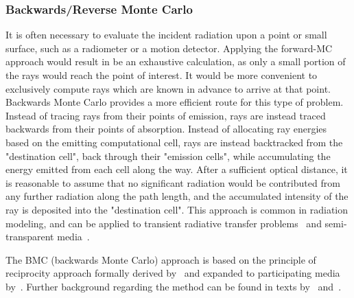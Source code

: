 \subsubsection{Backwards/Reverse Monte Carlo}
It is often necessary to evaluate the incident radiation upon a point or small surface, such as a radiometer or a motion detector.
Applying the forward-MC approach would result in be an exhaustive calculation, as only a small portion of the rays would reach the point of interest. It would be more convenient to exclusively compute rays which are known in advance to arrive at that point. 
Backwards Monte Carlo provides a more efficient route for this type of problem.
Instead of tracing rays from their points of emission, rays are instead traced backwards from their points of absorption.
Instead of allocating ray energies based on the emitting computational cell, rays are instead backtracked from the "destination cell", back through their "emission cells", while accumulating the energy emitted from each cell along the way. After a sufficient optical distance, it is reasonable to assume that no significant radiation would be contributed from any further radiation along the path length, and the accumulated intensity of the ray is deposited into the "destination cell". 
This approach is common in radiation modeling, and can be applied to transient radiative transfer problems~\cite{Lu2004ReverseMedia} and semi-transparent media~\cite{Li2005BackwardSlab}.

The BMC (backwards Monte Carlo) approach is based on the principle of reciprocity approach formally derived by~\citet{Case1957TransferPrinciple} and expanded to participating media by~\citet{Walters1992RigorousMedia}.
Further background regarding the method can be found in texts by~\citet{Modest2003BackwardTransfer} and~\citet{Howell2010ThermalTransfer}.

